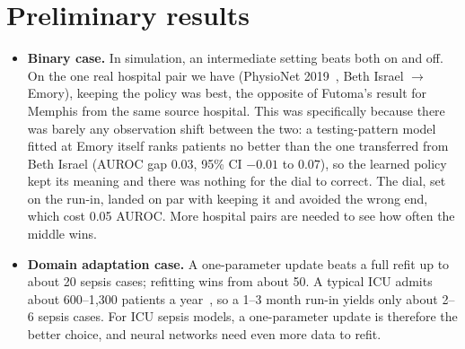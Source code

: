 \documentclass[11pt,a4paper]{article}
\begin{document}
\section{Preliminary results}

\begin{itemize}
  \item \textbf{Binary case.} In simulation, an intermediate setting beats both on and off. On the one real hospital pair we have (PhysioNet 2019~\cite{reyna2020}, Beth Israel $\to$ Emory), keeping the policy was best, the opposite of Futoma's result for Memphis from the same source hospital. This was specifically because there was barely any observation shift between the two: a testing-pattern model fitted at Emory itself ranks patients no better than the one transferred from Beth Israel (AUROC gap 0.03, 95\% CI $-0.01$ to $0.07$), so the learned policy kept its meaning and there was nothing for the dial to correct. The dial, set on the run-in, landed on par with keeping it and avoided the wrong end, which cost 0.05 AUROC. More hospital pairs are needed to see how often the middle wins.
  \item \textbf{Domain adaptation case.} A one-parameter update beats a full refit up to about 20 sepsis cases; refitting wins from about 50. A typical ICU admits about 600--1{,}300 patients a year~\cite{checkley2014,icnarc2024}, so a 1--3 month run-in yields only about 2--6 sepsis cases. For ICU sepsis models, a one-parameter update is therefore the better choice, and neural networks need even more data to refit.
\end{itemize}
\end{document}
